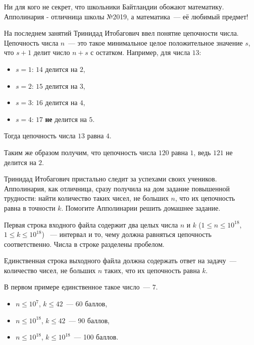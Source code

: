 
\Legend
Ни для кого не секрет, что школьники Байтландии обожают математику. Апполинария - отличница
школы №2019, а математика~--- её любимый предмет!

На последнем занятий Тринидад Итобагович ввел понятие цепочности числа. Цепочность числа $n$~---
это такое минимальное целое положительное значение $s$, что $s + 1$ делит число $n + s$ с остатком.
Например, для числа $13$:
\begin{itemize}
	\item $s = 1$: $14$ делится на $2$,
	\item $s = 2$: $15$ делится на $3$,
	\item $s = 3$: $16$ делится на $4$,
	\item $s = 4$: $17$ \textbf{не} делится на $5$.
\end{itemize}

Тогда цепочность числа $13$ равна $4$.

Таким же образом получим, что цепочность числа $120$ равна $1$, ведь $121$ не делится на $2$.

Тринидад Итобагович пристально следит за успехами своих учеников. Апполинария, как отличница,
сразу получила на дом задание повышенной трудности: найти количество таких чисел, не больших $n$,
что их цепочность равна в точности $k$. Помогите Апполинарии решить домашнее задание.

\Input
Первая строка входного файла содержит два целых числа $n$ и $k$ ($1 \le n \le 10^{18}$, $1 \le k \le 10^{18}$)
~--- интервал и то, чему должна равняться цепочность соответственно. Числа в строке разделены пробелом.

\Output
Единственная строка выходного файла должна содержать ответ на задачу~--- количество чисел, не больших $n$
таких, что их цепочность равна $k$.

\Samples
\BeginTests
\EndTests

В первом примере единственное такое число~--- $7$.

\Scoring
\begin{itemize}
	\item $n \le 10^7$, $k \le 42$~--- 60 баллов,
	\item $n \le 10^{18}$, $k \le 42$~--- 90 баллов,
	\item $n \le 10^{18}$, $k \le 10^{18}$~--- 100 баллов.
\end{itemize}

\EndProblem
